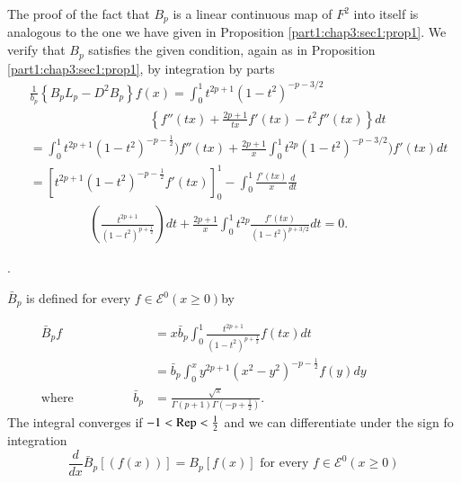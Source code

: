 The proof of the fact that $B_p$ is a linear continuous map of $F^2$
into itself is analogous to the one we have given in Proposition
\ref{part1:chap3:sec1:prop1}. We verify that $B_p$ satisfies the given condition, again as in
Proposition \ref{part1:chap3:sec1:prop1}, by integration by parts  
\begin{align*}
& \frac{1}{b_p} \left\{ B_p L_p - D^2 B_p \right\} f(x) 
   = \int^1_0 t^{ 2 p + 1} (1 - t^2)^{- p -3 / 2}\\ 
& \hspace{4cm} \left\{ f'' (tx) +
  \frac{2 p + 1}{tx}  f' (tx) - t^2 f'' (tx) \right\}dt \\ 
  & = \int^1_0 t^{ 2 p + 1} (1 - t^2)^{-p- \frac{1}{2}}) f'' (tx) +
  \frac{2 p + 1}{x}\int^1_0 t^{2p} (1 - t^2)^{-p-3 /2}) f' (tx) dt\\ 
  & = \left[ t^{ 2 p + 1} (1 - t^2)^{ - p - \frac{1}{2}}f' (tx) 
    \right ]_0^1 - \int^1 _0 \frac{f' (tx)}{x} \frac{d}{dt}\\ 
  & \hspace{2cm}\left(\frac{t^{
      2 p + 1}}{(1 - t^2)^{p + \frac {1}{2}}}\right)dt  + \frac{2 p +1}{x}
  \int_0^1 t^{2p}  \frac{f' (tx) }{(1 - t^2)^{p+ 3/2}} dt =0.   
\end{align*}

.  

$ \bar{B}_p $ is defined for every $ f \in \mathscr{E}^0 (x \geq 0) $by 

\begin{align*}
  \bar{B}_p f & = x \bar{b}_p \int^1_0 \frac{t^{ 2 p + 1}}{(1 - t^2)^{
      p + \frac{1}{2}}} f (tx)  dt   \\
  & = \bar{b}_p \int^x_0  y ^{ 2p + 1} (x^2 - y^2)^{- p- \frac{1}{2}}
  f (y) dy\hspace{2cm} \\ 
  \text{where}\hspace{2cm}\bar{b}_p & = \frac{\sqrt{\pi}}{\Gamma (p +
    1) \Gamma (- p + \frac{1}{2})}.  
\end{align*}
The integral converges if $-1< \operatorname{Rep}< \frac{1}{2}$ and we can
differentiate under the sign fo integration  
$$
\frac{d}{dx}\bar{B}_p [ (f (x) )]  = B_p [ f (x) ]\text{ for every } f
\in \mathscr{E}^0 (x \geq 0)  
$$ 

 
